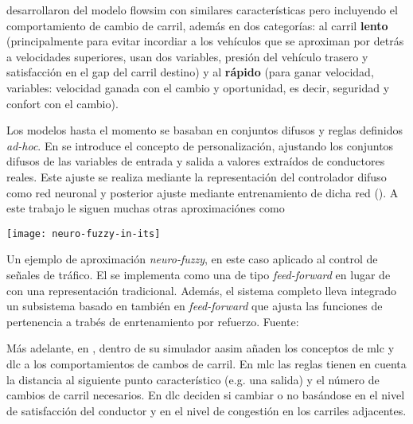 \cite{McDonald1997, Wu2003} desarrollaron del modelo \gls{flowsim} con similares características pero incluyendo el comportamiento de cambio de carril, además en dos categorías: al carril \textbf{lento} (principalmente para evitar incordiar a los vehículos que se aproximan por detrás a velocidades superiores, usan dos variables, presión del vehículo trasero y satisfacción en el gap del carril destino) y al \textbf{rápido} (para ganar velocidad, variables: velocidad ganada con el cambio y oportunidad, es decir, seguridad y confort con el cambio).

Los modelos hasta el momento se basaban en conjuntos difusos y reglas definidos \textit{ad-hoc}. En \cite{Chakroborty2003} se introduce el concepto de personalización, ajustando los conjuntos difusos de las variables de entrada y salida a valores extraídos de conductores reales. Este ajuste se realiza mediante la representación del controlador difuso como red neuronal y posterior ajuste mediante entrenamiento de dicha red (\textit{}). A este trabajo le siguen muchas otras aproximaciónes \textit{} como \cite{Ma2004, Zheng2005}

\begin{marginfigure}
	\texttt{[image: neuro-fuzzy-in-its]}
	\caption[Ejemplo de aproximación \textit{neuro-fuzzy} al control de señales de tráfico]{Un ejemplo de aproximación \textit{neuro-fuzzy}, en este caso aplicado al control de señales de tráfico. El  se implementa como una  de tipo \textit{feed-forward} en lugar de con una representación tradicional. Además, el sistema completo lleva integrado un subsistema basado en también en  \textit{feed-forward} que ajusta las funciones de pertenencia a trabés de enrtenamiento por refuerzo. Fuente: \cite{bingham2001reinforcement}}
	\label{fig:neuro-fuzzy-in-its}
\end{marginfigure}

Más adelante, en \cite{Das2009}, dentro de su simulador \gls{aasim} añaden los conceptos de \gls{mlc} y \gls{dlc} a los comportamientos de cambos de carril. En \gls{mlc} las reglas tienen en cuenta la distancia al siguiente punto característico (e.g. una salida) y el número de cambios de carril necesarios. En \gls{dlc} deciden si cambiar o no basándose en el nivel de satisfacción del conductor y en el nivel de congestión en los carriles adjacentes.

